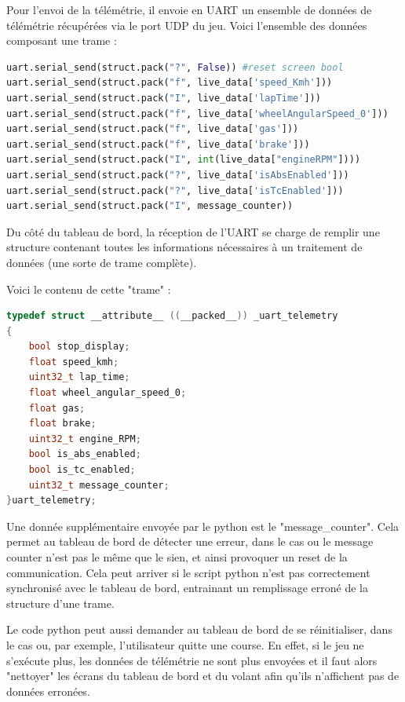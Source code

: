 \documentclass[french, 11pt]{article}
\begin{document}
			Pour l'envoi de la télémétrie, il envoie en UART un ensemble de données de télémétrie récupérées via le port UDP du jeu. Voici l'ensemble des données composant une trame :

			\begin{lstlisting}[language=python, caption=Données télémétriques envoyées par le python]
uart.serial_send(struct.pack("?", False)) #reset screen bool
uart.serial_send(struct.pack("f", live_data['speed_Kmh']))
uart.serial_send(struct.pack("I", live_data['lapTime']))
uart.serial_send(struct.pack("f", live_data['wheelAngularSpeed_0']))
uart.serial_send(struct.pack("f", live_data['gas']))
uart.serial_send(struct.pack("f", live_data['brake']))
uart.serial_send(struct.pack("I", int(live_data["engineRPM"])))
uart.serial_send(struct.pack("?", live_data['isAbsEnabled']))
uart.serial_send(struct.pack("?", live_data['isTcEnabled']))
uart.serial_send(struct.pack("I", message_counter))
			\end{lstlisting}

			Du côté du tableau de bord, la réception de l'UART se charge de remplir une structure contenant toutes les informations nécessaires à un traitement de données (une sorte de trame complète).

			Voici le contenu de cette "trame" : 

			\begin{lstlisting}[language=c, caption=Contenu d'une "trame" de données télémétriques côté tableau de bord]
typedef struct __attribute__ ((__packed__)) _uart_telemetry
{
	bool stop_display;
	float speed_kmh;
	uint32_t lap_time;
	float wheel_angular_speed_0;
	float gas;
	float brake;
	uint32_t engine_RPM;
	bool is_abs_enabled;
	bool is_tc_enabled;
	uint32_t message_counter;
}uart_telemetry;
			\end{lstlisting}

		
			Une donnée supplémentaire envoyée par le python est le "message\_counter". Cela permet au tableau de bord de détecter une erreur, dans le cas ou le message counter n'est pas le même que le sien, et ainsi provoquer un reset de la communication. Cela peut arriver si le script python n'est pas correctement synchronisé avec le tableau de bord, entrainant un remplissage erroné de la structure d'une trame.

			Le code python peut aussi demander au tableau de bord de se réinitialiser, dans le cas ou, par exemple, l'utilisateur quitte une course. En effet, si le jeu ne s'exécute plus, les données de télémétrie ne sont plus envoyées et il faut alors "nettoyer" les écrans du tableau de bord et du volant afin qu'ils n'affichent pas de données erronées.
\end{document}
